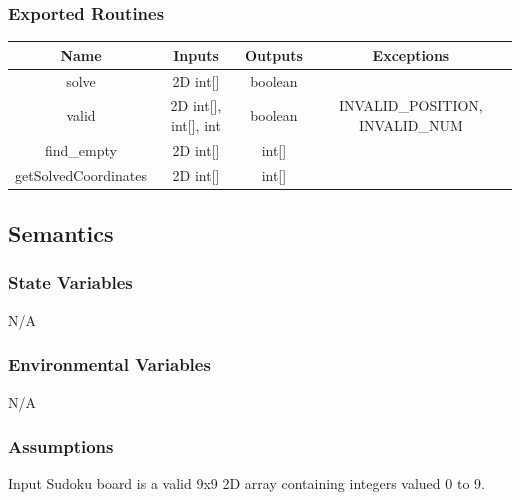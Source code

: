 \documentclass[11pt]{article}
\begin{document}
		\subsubsection{Exported Routines}
		\begin{tabular}[width=\textwidth, pos]{|c|c|c|c|}
			
			\hline
			\textbf{Name}& \textbf{Inputs} & \textbf{Outputs} & \textbf{Exceptions} \\ \hline
			solve & 2D int[] & boolean &  \\
			valid & 2D int[], int[], int & boolean & INVALID\_POSITION, INVALID\_NUM \\ 
			find\_empty & 2D int[] & int[] &  \\ 
			getSolvedCoordinates & 2D int[] & int[] & \\
			\hline
			
		\end{tabular}
		
		\subsection{Semantics}
		\subsubsection{State Variables}
		N/A
		
		\subsubsection{Environmental Variables}
		N/A
		
		\subsubsection{Assumptions}
		Input Sudoku board is a valid 9x9 2D array containing integers valued 0 to 9.
		
\end{document}
